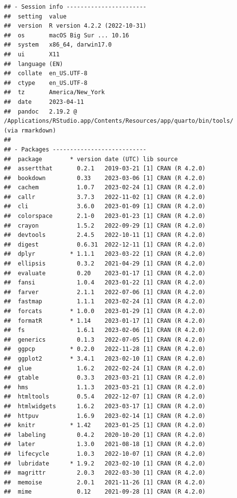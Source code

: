 \documentclass[print]{nuthesis}
\begin{document}
\begin{verbatim}
## - Session info -----------------------
##  setting  value
##  version  R version 4.2.2 (2022-10-31)
##  os       macOS Big Sur ... 10.16
##  system   x86_64, darwin17.0
##  ui       X11
##  language (EN)
##  collate  en_US.UTF-8
##  ctype    en_US.UTF-8
##  tz       America/New_York
##  date     2023-04-11
##  pandoc   2.19.2 @ /Applications/RStudio.app/Contents/Resources/app/quarto/bin/tools/ (via rmarkdown)
## 
## - Packages ---------------------------
##  package        * version date (UTC) lib source
##  assertthat       0.2.1   2019-03-21 [1] CRAN (R 4.2.0)
##  bookdown         0.33    2023-03-06 [1] CRAN (R 4.2.0)
##  cachem           1.0.7   2023-02-24 [1] CRAN (R 4.2.0)
##  callr            3.7.3   2022-11-02 [1] CRAN (R 4.2.0)
##  cli              3.6.0   2023-01-09 [1] CRAN (R 4.2.0)
##  colorspace       2.1-0   2023-01-23 [1] CRAN (R 4.2.0)
##  crayon           1.5.2   2022-09-29 [1] CRAN (R 4.2.0)
##  devtools         2.4.5   2022-10-11 [1] CRAN (R 4.2.0)
##  digest           0.6.31  2022-12-11 [1] CRAN (R 4.2.0)
##  dplyr          * 1.1.1   2023-03-22 [1] CRAN (R 4.2.0)
##  ellipsis         0.3.2   2021-04-29 [1] CRAN (R 4.2.0)
##  evaluate         0.20    2023-01-17 [1] CRAN (R 4.2.0)
##  fansi            1.0.4   2023-01-22 [1] CRAN (R 4.2.0)
##  farver           2.1.1   2022-07-06 [1] CRAN (R 4.2.0)
##  fastmap          1.1.1   2023-02-24 [1] CRAN (R 4.2.0)
##  forcats        * 1.0.0   2023-01-29 [1] CRAN (R 4.2.0)
##  formatR        * 1.14    2023-01-17 [1] CRAN (R 4.2.0)
##  fs               1.6.1   2023-02-06 [1] CRAN (R 4.2.0)
##  generics         0.1.3   2022-07-05 [1] CRAN (R 4.2.0)
##  ggpcp          * 0.2.0   2022-11-28 [1] CRAN (R 4.2.0)
##  ggplot2        * 3.4.1   2023-02-10 [1] CRAN (R 4.2.0)
##  glue             1.6.2   2022-02-24 [1] CRAN (R 4.2.0)
##  gtable           0.3.3   2023-03-21 [1] CRAN (R 4.2.0)
##  hms              1.1.3   2023-03-21 [1] CRAN (R 4.2.0)
##  htmltools        0.5.4   2022-12-07 [1] CRAN (R 4.2.0)
##  htmlwidgets      1.6.2   2023-03-17 [1] CRAN (R 4.2.0)
##  httpuv           1.6.9   2023-02-14 [1] CRAN (R 4.2.0)
##  knitr          * 1.42    2023-01-25 [1] CRAN (R 4.2.0)
##  labeling         0.4.2   2020-10-20 [1] CRAN (R 4.2.0)
##  later            1.3.0   2021-08-18 [1] CRAN (R 4.2.0)
##  lifecycle        1.0.3   2022-10-07 [1] CRAN (R 4.2.0)
##  lubridate      * 1.9.2   2023-02-10 [1] CRAN (R 4.2.0)
##  magrittr         2.0.3   2022-03-30 [1] CRAN (R 4.2.0)
##  memoise          2.0.1   2021-11-26 [1] CRAN (R 4.2.0)
##  mime             0.12    2021-09-28 [1] CRAN (R 4.2.0)

\end{verbatim}
\end{document}
